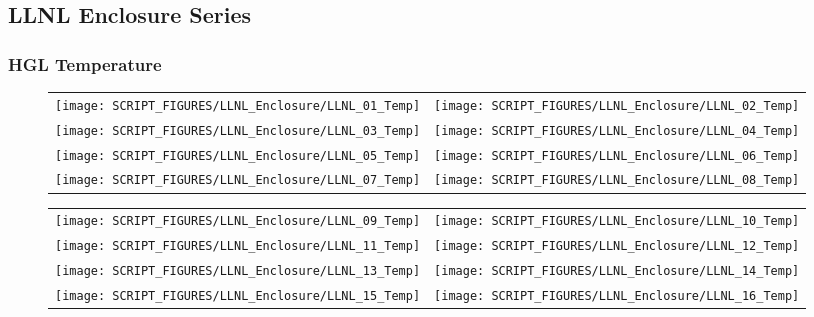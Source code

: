 \clearpage

\subsection{LLNL Enclosure Series}

\subsubsection{HGL Temperature}

\begin{figure}[!ht]
\begin{tabular*}{\textwidth}{l@{\extracolsep{\fill}}r}
\texttt{[image: SCRIPT\_FIGURES/LLNL\_Enclosure/LLNL\_01\_Temp]} &
\texttt{[image: SCRIPT\_FIGURES/LLNL\_Enclosure/LLNL\_02\_Temp]} \\
\texttt{[image: SCRIPT\_FIGURES/LLNL\_Enclosure/LLNL\_03\_Temp]} &
\texttt{[image: SCRIPT\_FIGURES/LLNL\_Enclosure/LLNL\_04\_Temp]} \\
\texttt{[image: SCRIPT\_FIGURES/LLNL\_Enclosure/LLNL\_05\_Temp]} &
\texttt{[image: SCRIPT\_FIGURES/LLNL\_Enclosure/LLNL\_06\_Temp]} \\
\texttt{[image: SCRIPT\_FIGURES/LLNL\_Enclosure/LLNL\_07\_Temp]} &
\texttt{[image: SCRIPT\_FIGURES/LLNL\_Enclosure/LLNL\_08\_Temp]}
\end{tabular*}
\label{LLNL_Enclosure_Temp_1}
\end{figure}

\begin{figure}[!ht]
\begin{tabular*}{\textwidth}{l@{\extracolsep{\fill}}r}
\texttt{[image: SCRIPT\_FIGURES/LLNL\_Enclosure/LLNL\_09\_Temp]} &
\texttt{[image: SCRIPT\_FIGURES/LLNL\_Enclosure/LLNL\_10\_Temp]} \\
\texttt{[image: SCRIPT\_FIGURES/LLNL\_Enclosure/LLNL\_11\_Temp]} &
\texttt{[image: SCRIPT\_FIGURES/LLNL\_Enclosure/LLNL\_12\_Temp]} \\
\texttt{[image: SCRIPT\_FIGURES/LLNL\_Enclosure/LLNL\_13\_Temp]} &
\texttt{[image: SCRIPT\_FIGURES/LLNL\_Enclosure/LLNL\_14\_Temp]} \\
\texttt{[image: SCRIPT\_FIGURES/LLNL\_Enclosure/LLNL\_15\_Temp]} &
\texttt{[image: SCRIPT\_FIGURES/LLNL\_Enclosure/LLNL\_16\_Temp]}
\end{tabular*}
\label{LLNL_Enclosure_Temp_2}
\end{figure}

